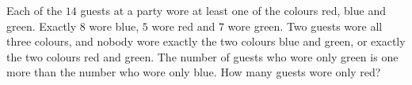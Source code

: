 Each of the \(14\) guests at a party wore at least one of the colours red, blue and green. Exactly \(8\) wore blue, \(5\) wore red and \(7\) wore green. Two guests wore all three colours, and nobody wore exactly the two colours blue and green, or exactly the two colours red and green. The number of guests who wore only green is one more than the number who wore only blue. How many guests wore only red?
